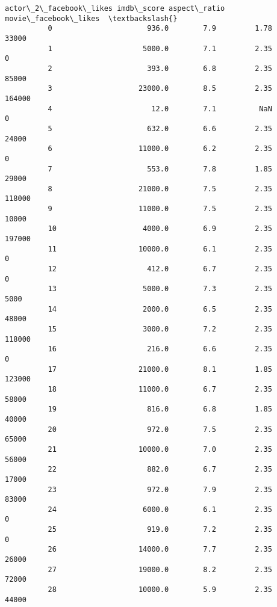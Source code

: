 \documentclass[11pt]{article}
\begin{document}
\begin{Verbatim}[commandchars=\\\{\}]
                actor\_2\_facebook\_likes imdb\_score aspect\_ratio  movie\_facebook\_likes  \textbackslash{}
          0                      936.0        7.9         1.78                 33000   
          1                     5000.0        7.1         2.35                     0   
          2                      393.0        6.8         2.35                 85000   
          3                    23000.0        8.5         2.35                164000   
          4                       12.0        7.1          NaN                     0   
          5                      632.0        6.6         2.35                 24000   
          6                    11000.0        6.2         2.35                     0   
          7                      553.0        7.8         1.85                 29000   
          8                    21000.0        7.5         2.35                118000   
          9                    11000.0        7.5         2.35                 10000   
          10                    4000.0        6.9         2.35                197000   
          11                   10000.0        6.1         2.35                     0   
          12                     412.0        6.7         2.35                     0   
          13                    5000.0        7.3         2.35                  5000   
          14                    2000.0        6.5         2.35                 48000   
          15                    3000.0        7.2         2.35                118000   
          16                     216.0        6.6         2.35                     0   
          17                   21000.0        8.1         1.85                123000   
          18                   11000.0        6.7         2.35                 58000   
          19                     816.0        6.8         1.85                 40000   
          20                     972.0        7.5         2.35                 65000   
          21                   10000.0        7.0         2.35                 56000   
          22                     882.0        6.7         2.35                 17000   
          23                     972.0        7.9         2.35                 83000   
          24                    6000.0        6.1         2.35                     0   
          25                     919.0        7.2         2.35                     0   
          26                   14000.0        7.7         2.35                 26000   
          27                   19000.0        8.2         2.35                 72000   
          28                   10000.0        5.9         2.35                 44000   

\end{Verbatim}
\end{document}
